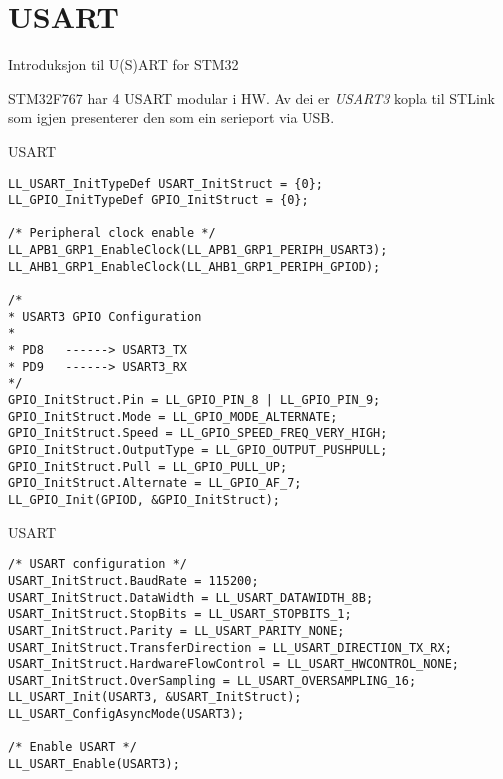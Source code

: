 \section{USART}

\begin{frame}{Introduksjon til U(S)ART for STM32}
	
STM32F767 har 4 USART modular i HW. Av dei er \textit{USART3} kopla til STLink som igjen presenterer den som ein serieport via USB.
	
\end{frame}




\begin{frame}[containsverbatim]{USART}
	
\begin{verbatim}
LL_USART_InitTypeDef USART_InitStruct = {0};
LL_GPIO_InitTypeDef GPIO_InitStruct = {0};

/* Peripheral clock enable */
LL_APB1_GRP1_EnableClock(LL_APB1_GRP1_PERIPH_USART3);
LL_AHB1_GRP1_EnableClock(LL_AHB1_GRP1_PERIPH_GPIOD);

/*
* USART3 GPIO Configuration
*
* PD8   ------> USART3_TX
* PD9   ------> USART3_RX
*/
GPIO_InitStruct.Pin = LL_GPIO_PIN_8 | LL_GPIO_PIN_9;
GPIO_InitStruct.Mode = LL_GPIO_MODE_ALTERNATE;
GPIO_InitStruct.Speed = LL_GPIO_SPEED_FREQ_VERY_HIGH;
GPIO_InitStruct.OutputType = LL_GPIO_OUTPUT_PUSHPULL;
GPIO_InitStruct.Pull = LL_GPIO_PULL_UP;
GPIO_InitStruct.Alternate = LL_GPIO_AF_7;
LL_GPIO_Init(GPIOD, &GPIO_InitStruct);
\end{verbatim}
	
\end{frame}

\begin{frame}[containsverbatim]{USART}
	
\begin{verbatim}
/* USART configuration */
USART_InitStruct.BaudRate = 115200;
USART_InitStruct.DataWidth = LL_USART_DATAWIDTH_8B;
USART_InitStruct.StopBits = LL_USART_STOPBITS_1;
USART_InitStruct.Parity = LL_USART_PARITY_NONE;
USART_InitStruct.TransferDirection = LL_USART_DIRECTION_TX_RX;
USART_InitStruct.HardwareFlowControl = LL_USART_HWCONTROL_NONE;
USART_InitStruct.OverSampling = LL_USART_OVERSAMPLING_16;
LL_USART_Init(USART3, &USART_InitStruct);
LL_USART_ConfigAsyncMode(USART3);

/* Enable USART */
LL_USART_Enable(USART3);
\end{verbatim}
	
\end{frame}



